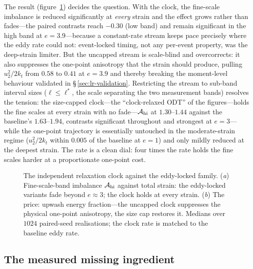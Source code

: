 \documentclass[11pt,a4paper]{article}
\begin{document}
The result (figure~\ref{fig:clock}) decides the question. With the
clock, the fine-scale imbalance is reduced significantly at
\emph{every} strain and the effect grows rather than fades---the paired
contrasts reach $-0.30$ (low band) and remain significant in the high
band at $e=3.9$---because a constant-rate stream keeps pace precisely
where the eddy rate could not: event-locked timing, not any per-event
property, was the deep-strain limiter. But the uncapped stream is
scale-blind and overcorrects: it also suppresses the one-point
anisotropy that the strain should produce, pulling $u_2^2/2k_t$ from
$0.58$ to $0.41$ at $e=3.9$ and thereby breaking the moment-level
behaviour validated in \S\,\ref{sec:lr-validation}. Restricting the
stream to sub-band interval sizes ($\ell\le\ell^{*}$, the scale
separating the two measurement bands) resolves the tension: the
size-capped clock---the ``clock-relaxed ODT'' of the figures---holds the
fine scales at every strain with no
fade---$\mathcal A_{\rm hi}$ at $1.30$--$1.44$ against the baseline's
$1.63$--$1.94$, contrasts significant throughout and strongest at
$e=3$---while the one-point trajectory is essentially untouched in the
moderate-strain regime ($u_2^2/2k_t$ within $0.005$ of the baseline at
$e=1$) and only mildly reduced at the deepest strain. The rate is a
clean dial: four times the rate holds the fine scales harder at a
proportionate one-point cost.

\begin{figure}
  \centering
  \caption{The independent relaxation clock against the eddy-locked
  family. (\textit{a}) Fine-scale-band imbalance $\mathcal A_{\rm hi}$
  against total strain: the eddy-locked variants fade beyond
  $e\approx3$; the clock holds at every strain. (\textit{b}) The
  price: upwash energy fraction---the uncapped clock suppresses the
  physical one-point anisotropy, the size cap restores it. Medians
  over $1024$ paired-seed realisations; the clock rate is matched to
  the baseline eddy rate.}
  \label{fig:clock}
\end{figure}

\subsection{The measured missing ingredient}\label{sec:limits-endpoint}
\end{document}
